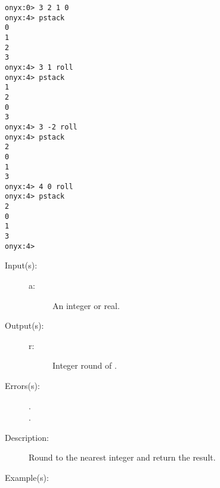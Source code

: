 \begin{description}
\begin{description}
\begin{verbatim}
onyx:0> 3 2 1 0
onyx:4> pstack
0
1
2
3
onyx:4> 3 1 roll
onyx:4> pstack
1
2
0
3
onyx:4> 3 -2 roll
onyx:4> pstack
2
0
1
3
onyx:4> 4 0 roll
onyx:4> pstack
2
0
1
3
onyx:4>
		\end{verbatim}
	\end{description}
\label{systemdict:round}
\item[{\onyxop{a}{round}{r}}: ]
	\begin{description}\item[]
	\item[Input(s): ]
		\begin{description}\item[]
		\item[a: ]
			An integer or real.
		\end{description}
	\item[Output(s): ]
		\begin{description}\item[]
		\item[r: ]
			Integer round of .
		\end{description}
	\item[Errors(s): ]
		\begin{description}\item[]
		\item[.]
		\item[.]
		\end{description}
	\item[Description: ]
		Round  to the nearest integer and return the result.
	\item[Example(s): ]\begin{verbatim}


\end{verbatim}
\end{description}
\end{description}
